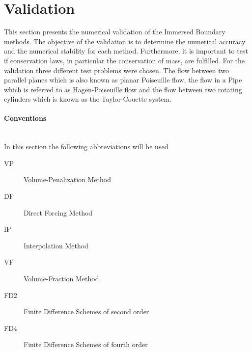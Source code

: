 \section{Validation}

This section presents the numerical validation of the Immersed Boundary methods.
The objective of the validation is to determine the numerical accuracy and
the numerical stability for each method.
Furthermore, it is important to test if conservation laws, in particular the conservation of mass,
are fulfilled.
For the validation three different test problems were chosen.
The flow between two parallel planes which is also known as planar Poiseuille flow, the flow in a Pipe which is referred to as Hagen-Poiseuille flow and the flow
between two rotating cylinders which is known as the Taylor-Couette system.

\paragraph{Conventions}\mbox{}\\

In this section the following abbreviations will be used

\begin{multicols}{2}
\begin{description}
    \item[VP]{Volume-Penalization Method}
    \item[DF]{Direct Forcing Method}
    \item[IP]{Interpolation Method}
    \item[VF]{Volume-Fraction Method}
    \item[FD2]{Finite Difference Schemes of second order}
    \item[FD4]{Finite Difference Schemes of fourth order}
\end{description}
\end{multicols}

